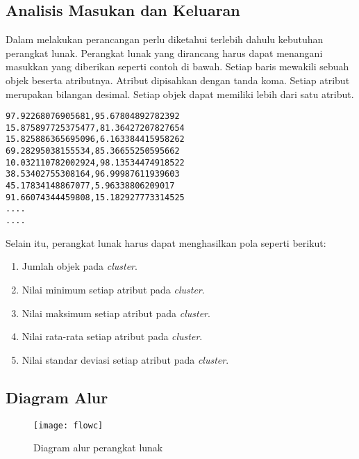 \subsection{Analisis Masukan dan Keluaran}

Dalam melakukan perancangan perlu diketahui terlebih dahulu kebutuhan perangkat lunak. Perangkat lunak yang dirancang harus dapat menangani masukkan yang diberikan seperti contoh di bawah. Setiap baris mewakili sebuah objek beserta atributnya. Atribut dipisahkan dengan tanda koma. Setiap atribut merupakan bilangan desimal. Setiap objek dapat memiliki lebih dari satu atribut.

\begin{verbatim}
97.92268076905681,95.67804892782392
15.875897725375477,81.36427207827654
15.825886365695096,6.163384415958262
69.28295038155534,85.36655250595662
10.032110782002924,98.13534474918522
38.53402755308164,96.99987611939603
45.17834148867077,5.96338806209017
91.66074344459808,15.182927773314525
....
....
\end{verbatim} 

Selain itu, perangkat lunak harus dapat menghasilkan pola seperti berikut:

\begin{enumerate}

\item Jumlah objek pada \textit{cluster}.

\item Nilai minimum setiap atribut pada \textit{cluster}.

\item Nilai maksimum setiap atribut pada \textit{cluster}.

\item Nilai rata-rata setiap atribut pada \textit{cluster}.

\item Nilai standar deviasi setiap atribut pada \textit{cluster}.
\end{enumerate}

\subsection{Diagram Alur}

\begin{figure}[H]
    \centering  
    \texttt{[image: flowc]}  
    \caption[Diagram alur perangkat lunak]{Diagram alur perangkat lunak} 
    \label{fig:flowc} 
\end{figure}

